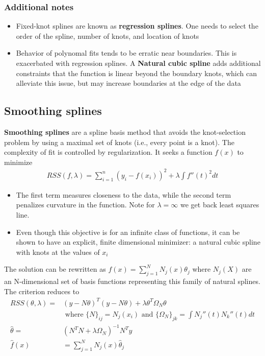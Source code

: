 \documentclass{article}
\begin{document}
\subsubsection{Additional notes}
\begin{itemize}
  \item Fixed-knot splines are known as \textbf{regression splines}. One needs to select the order of the spline, number of knots, and location of knots
  \item Behavior of polynomal fits tends to be erratic near boundaries. This is exacerbated with regression splines. A \textbf{Natural cubic spline} adds additional constraints that the function is linear beyond the boundary knots, which can alleviate this issue, but may increase boundaries at the edge of the data
\end{itemize}

\subsection{Smoothing splines}
\textbf{Smoothing splines} are a spline basis method that avoids the knot-selection problem by using a maximal set of knots (i.e., every point is a knot). The complexity of fit is controlled by regularization. It seeks a function $f(x)$ to minimize 
\begin{align*}
  RSS(f, \lambda) = \sum_{i=1}^n(y_i - f(x_i))^2 + \lambda \int f''(t)^2dt
\end{align*}
\begin{itemize}
  \item The first term measures closeness to the data, while the second term penalizes curvature in the function. Note for $\lambda = \infty$ we get back least squares line.
  \item Even though this objective is for an infinite class of functions, it can be shown to have an explicit, finite dimensional minimizer: a natural cubic spline with knots at the values of $x_i$
\end{itemize}
The solution can be rewritten as $f(x) = \sum_{j=1}^NN_j(x)\theta_j$ where $N_j(X)$ are an N-dimensional set of basis functions representing this family of natural splines. The criterion reduces to
\begin{align*}
  RSS(\theta, \lambda) =& (y - N\theta)^T(y-N\theta) + \lambda \theta^T\Omega_N\theta\\
  & \textrm{ where } \{N\}_{ij} = N_j(x_i) \textrm{ and } \{\Omega_N\}_{jk} = \int N_j''(t)N_k''(t)dt\\
  \hat{\theta} =& (N^TN + \lambda\Omega_N)^{-1}N^Ty\\
  \hat{f}(x) &= \sum_{j=1}^NN_j(x)\hat{\theta}_j
\end{align*}
\end{document}
